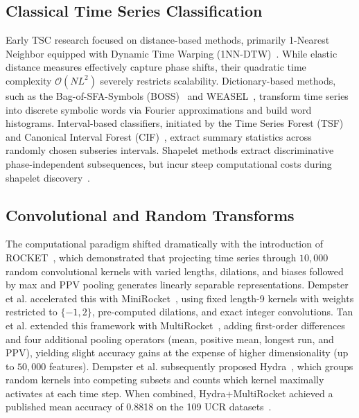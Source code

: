 \documentclass[journal,twocolumn]{article}
\begin{document}
\subsection{Classical Time Series Classification}
Early TSC research focused on distance-based methods, primarily 1-Nearest Neighbor equipped with Dynamic Time Warping (1NN-DTW)~\cite{bagnall2017great}. While elastic distance measures effectively capture phase shifts, their quadratic time complexity $\mathcal{O}(N L^2)$ severely restricts scalability. Dictionary-based methods, such as the Bag-of-SFA-Symbols (BOSS)~\cite{schafer2015boss} and WEASEL~\cite{schafer2017weasel}, transform time series into discrete symbolic words via Fourier approximations and build word histograms. Interval-based classifiers, initiated by the Time Series Forest (TSF)~\cite{deng2013time} and Canonical Interval Forest (CIF)~\cite{middlehurst2020canonical}, extract summary statistics across randomly chosen subseries intervals. Shapelet methods extract discriminative phase-independent subsequences, but incur steep computational costs during shapelet discovery~\cite{bagnall2017great}.

\subsection{Convolutional and Random Transforms}
The computational paradigm shifted dramatically with the introduction of ROCKET~\cite{dempster2020rocket}, which demonstrated that projecting time series through $10,000$ random convolutional kernels with varied lengths, dilations, and biases followed by max and PPV pooling generates linearly separable representations. Dempster et al. accelerated this with MiniRocket~\cite{dempster2021minirocket}, using fixed length-9 kernels with weights restricted to $\{-1, 2\}$, pre-computed dilations, and exact integer convolutions. Tan et al. extended this framework with MultiRocket~\cite{tan2022multirocket}, adding first-order differences and four additional pooling operators (mean, positive mean, longest run, and PPV), yielding slight accuracy gains at the expense of higher dimensionality (up to $50,000$ features). Dempster et al. subsequently proposed Hydra~\cite{dempster2023hydra}, which groups random kernels into competing subsets and counts which kernel maximally activates at each time step. When combined, Hydra+MultiRocket achieved a published mean accuracy of 0.8818 on the 109 UCR datasets~\cite{dempster2023hydra}.
\end{document}
